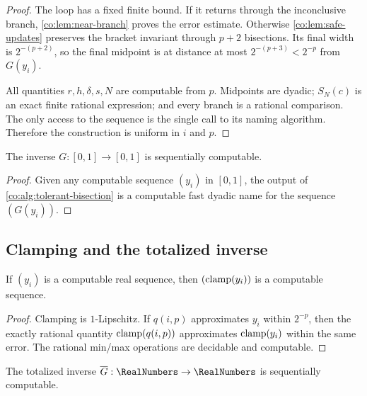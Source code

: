 \begin{proof}
The loop has a fixed finite bound.  If it returns through the inconclusive
branch, \cref{co:lem:near-branch} proves the error estimate.  Otherwise
\cref{co:lem:safe-updates} preserves the bracket invariant through $p+2$
bisections.  Its final width is $2^{-(p+2)}$, so the final midpoint is at
distance at most $2^{-(p+3)}<2^{-p}$ from $G(y_i)$.

All quantities $r,h,\delta,s,N$ are computable from $p$.  Midpoints are
dyadic; $S_N(c)$ is an exact finite rational expression; and every branch is
a rational comparison.  The only access to the sequence is the single call to
its naming algorithm.  Therefore the construction is uniform in $i$ and $p$.
\end{proof}

\begin{corollary}
\label{co:cor:G-sequential}
The inverse $G:[0,1]\to[0,1]$ is sequentially computable.
\end{corollary}

\begin{proof}
Given any computable sequence $(y_i)$ in $[0,1]$, the output of
\cref{co:alg:tolerant-bisection} is a computable fast dyadic name for the sequence
$(G(y_i))$.
\end{proof}

\subsection{Clamping and the totalized inverse}

\begin{lemma}\label{co:lem:clamp-computable}
If $(y_i)$ is a computable real sequence, then
$(\operatorname{clamp}(y_i))$ is a computable sequence.
\end{lemma}

\begin{proof}
Clamping is $1$-Lipschitz.  If $q(i,p)$ approximates $y_i$ within $2^{-p}$,
then the exactly rational quantity $\operatorname{clamp}(q(i,p))$ approximates
$\operatorname{clamp}(y_i)$ within the same error.  The rational min/max operations are
decidable and computable.
\end{proof}

\begin{corollary}
\label{co:cor:GT-sequential}
The totalized inverse $\InvT:\RealNumbers\to\RealNumbers$ is sequentially computable.
\end{corollary}

